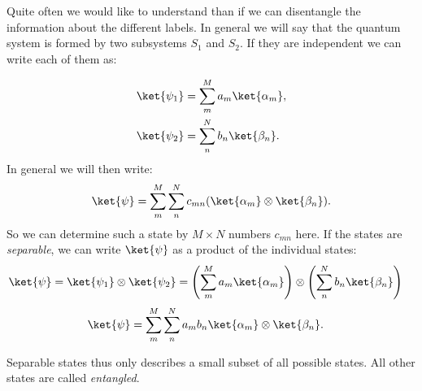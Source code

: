  Quite often we would like to understand than if we can disentangle the information about the different labels. In general we will say that the quantum system is formed by two subsystems $S_1$ and $S_2$. If they are independent we can write each of them as:

\begin{align}
				\ket{\psi_1}&=\sum_m^M a_m \ket{\alpha_m},\\
				\ket{\psi_2}&=\sum_n^N b_n \ket{\beta_n}.
			
\end{align}
In general we will then write:
\begin{align}
\ket{\psi}=\sum_m^M \sum_n^N c_{mn}(\ket{\alpha_m}\otimes \ket{\beta_n}).
\end{align}
So we can determine such a state by $M \times N$ numbers $c_{mn}$ here.  If the states are \textit{separable}, we can write $\ket{\psi}$ as a product of the individual states:
\begin{align}
 \label{eq:psientangled} 
	\ket{\psi}	&=\ket{\psi_1}\otimes\ket{\psi_2}=\left(\sum_m^M a_m \ket{\alpha_m}\right) \otimes \left(\sum_n^N b_n \ket{\beta_n}\right)
\end{align}
\begin{align}
\ket{\psi}	&=\sum_m^M \sum_n^N a_m b_n \ket{\alpha_m} \otimes \ket{\beta_n}. \label{eq:psientangled3} 
\end{align}

Separable states thus only describes a small subset of all possible states. All other states are called \textit{entangled}.